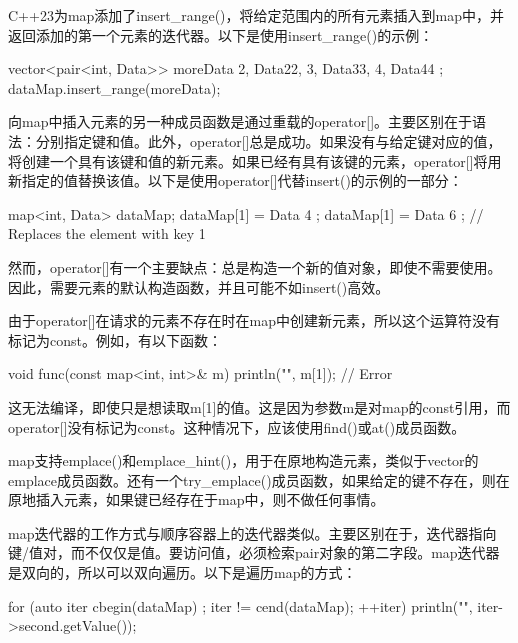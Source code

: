 

C++23为map添加了insert\_range()，将给定范围内的所有元素插入到map中，并返回添加的第一个元素的迭代器。以下是使用insert\_range()的示例：

\begin{cpp}
vector<pair<int, Data>> moreData { {2, Data{22}}, {3, Data{33}}, {4, Data{44}} };
dataMap.insert_range(moreData);
\end{cpp}


向map中插入元素的另一种成员函数是通过重载的operator[]。主要区别在于语法：分别指定键和值。此外，operator[]总是成功。如果没有与给定键对应的值，将创建一个具有该键和值的新元素。如果已经有具有该键的元素，operator[]将用新指定的值替换该值。以下是使用operator[]代替insert()的示例的一部分：

\begin{cpp}
map<int, Data> dataMap;
dataMap[1] = Data { 4 };
dataMap[1] = Data { 6 }; // Replaces the element with key 1
\end{cpp}

然而，operator[]有一个主要缺点：总是构造一个新的值对象，即使不需要使用。因此，需要元素的默认构造函数，并且可能不如insert()高效。

由于operator[]在请求的元素不存在时在map中创建新元素，所以这个运算符没有标记为const。例如，有以下函数：

\begin{cpp}
void func(const map<int, int>& m)
{
    println("{}", m[1]); // Error
}
\end{cpp}

这无法编译，即使只是想读取m[1]的值。这是因为参数m是对map的const引用，而operator[]没有标记为const。这种情况下，应该使用find()或at()成员函数。


map支持emplace()和emplace\_hint()，用于在原地构造元素，类似于vector的emplace成员函数。还有一个try\_emplace()成员函数，如果给定的键不存在，则在原地插入元素，如果键已经存在于map中，则不做任何事情。


map迭代器的工作方式与顺序容器上的迭代器类似。主要区别在于，迭代器指向键/值对，而不仅仅是值。要访问值，必须检索pair对象的第二字段。map迭代器是双向的，所以可以双向遍历。以下是遍历map的方式：

\begin{cpp}
for (auto iter { cbegin(dataMap) }; iter != cend(dataMap); ++iter) {
    println("{}", iter->second.getValue());
}
\end{cpp}

